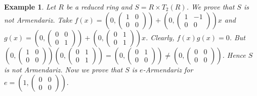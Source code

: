 \documentclass[10pt,a4paper]{amsart}
\newtheorem{example}{Example}[section]
\numberwithin{equation}{section}
\begin{document}
\begin{example}
	Let $R$ be a reduced ring and $S=R\times T_2(R)$. We prove that $S$ is not Armendariz. Take $f(x)=\left(0,\begin{pmatrix}
		1&0\\0&0
	\end{pmatrix}\right)+\left(0,\begin{pmatrix}
	1&-1\\0&0
	\end{pmatrix}\right)x$ and $g(x)=\left(0,\begin{pmatrix}
	0&0\\0&1
	\end{pmatrix}\right)+\left(0,\begin{pmatrix}
	0&1\\0&1
	\end{pmatrix}\right)x$. Clearly, $f(x)g(x)=0$. But $\left(0,\begin{pmatrix}
	1&0\\0&0
	\end{pmatrix}\right)\left(0,\begin{pmatrix}
	0&1\\0&1
	\end{pmatrix}\right)=\left(0,\begin{pmatrix}
	0&1\\0&0
	\end{pmatrix}\right)\ne \left(0,\begin{pmatrix}
	0&0\\0&0
	\end{pmatrix}\right)$. Hence $S$ is not Armendariz. Now we prove that $S$ is $e$-Armendariz for $e=\left(1,\begin{pmatrix}
	0&0\\0&0
	\end{pmatrix}\right).$
\end{example}
\end{document}
